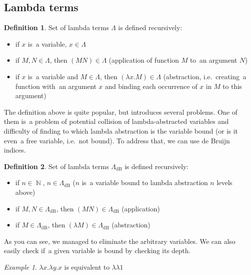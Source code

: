 \documentclass[final]{article}
\theoremstyle{definition}
\newtheorem{definition}{Definition}[subsection]
\theoremstyle{definition}
\theoremstyle{remark}
\newtheorem{example}{Example}[subsection]
\newcommand{\LambdadB}{\ensuremath{\Lambda_{\text{dB}}}}
\DeclareMathOperator{\N}{\mathbb{N}}
\begin{document}
\subsection{Lambda terms}%
\label{sub:lambda_terms}

\begin{definition}
    Set of lambda terms \(\Lambda\) is defined recursively:
    \begin{itemize}
        \item if \(x\) is~a variable, \(x \in \Lambda\)
        \item if \(M, N \in \Lambda\), then \((M N) \in \Lambda\) (application of function \(M\) to~an argument \(N\))
        \item if \(x\) is~a variable and \(M \in \Lambda\), then \((\lambda x . M) \in \Lambda\) (abstraction, i.e.~creating~a function with~an argument \(x\) and binding each occurrence of \(x\) in \(M\) to this argument)
    \end{itemize}
\end{definition}

The definition above is quite popular, but introduces several problems. One of them is~a problem of potential collision of lambda-abstracted variables and difficulty of finding to which lambda abstraction is the variable bound (or is it even~a free variable, i.e.~not bound). To address that, we can use de Bruijn indices.

\begin{definition}
    Set of lambda terms \(\LambdadB\) is defined recursively:
    \begin{itemize}
        \item if \(n \in \N\), \(n \in \LambdadB\) (\(n\) is~a variable bound to lambda abstraction \(n\) levels above)
        \item if \(M, N \in \LambdadB\), then \((M N) \in \LambdadB\) (application)
        \item if \(M \in \LambdadB\), then \((\lambda M) \in \LambdadB\) (abstraction)
    \end{itemize}
\end{definition}

As you can see, we managed to eliminate the arbitrary variables. We can also easily check if~a given variable is bound by checking its depth.

\begin{example}
    \(\lambda x . \lambda y . x\) is equivalent to \(\lambda \lambda 1\)
\end{example}
\end{document}
